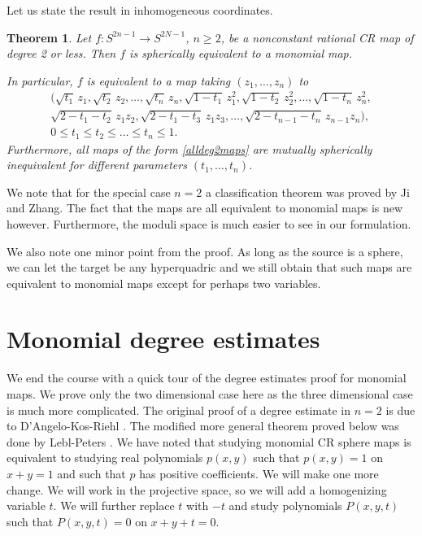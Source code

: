 \documentclass[12pt,openany]{book}
\newcommand{\sectionnewpage}{}
\theoremstyle{plain}
\newtheorem{thm}{Theorem}[section]
\theoremstyle{remark}
\theoremstyle{definition}
\theoremstyle{exercise}
\theoremstyle{example}
\begin{document}
Let us state the result in inhomogeneous coordinates.

\begin{thm} \label{thm:deg2class}
Let $f \colon S^{2n-1} \to S^{2N-1}$, $n \geq 2$, be a nonconstant
rational CR map
of degree 2 or less.  Then $f$ 
is spherically equivalent to a monomial map.

In particular, $f$ is equivalent to a map taking $(z_1,\ldots,z_n)$ to
\begin{multline} \label{alldeg2maps}
\bigl(
\sqrt{t_1} \, z_1 , 
\sqrt{t_2} \, z_2 , 
\ldots ,
\sqrt{t_n} \, z_n , 
\sqrt{1-t_1} \, z_1^2 , 
\sqrt{1-t_2} \, z_2^2 , 
\ldots ,
\sqrt{1-t_n} \, z_n^2 , 
\\
\sqrt{2-t_1-t_2} \, z_1z_2 , 
\sqrt{2-t_1-t_3} \, z_1z_3 , 
\ldots ,
\sqrt{2-t_{n-1}-t_n} \, z_{n-1}z_n \bigr) , 
\\
0 \leq t_1 \leq t_2 \leq \dots \leq t_n \leq 1.
\end{multline}
Furthermore, all maps of the form \eqref{alldeg2maps} are mutually
spherically inequivalent for different parameters $(t_1,\ldots,t_n)$.
\end{thm}

We note that for the special case
$n=2$ a classification theorem was proved by Ji and Zhang.
The fact that the maps are all equivalent to monomial maps is new however.
Furthermore, the moduli space is much easier to see in our formulation.

We also note one minor point from the proof.  As long as the source is a
sphere, we can let the target be any hyperquadric and we still obtain that
such maps are equivalent to monomial maps except for perhaps two variables.


\sectionnewpage
\section{Monomial degree estimates}

We end the course with a quick tour of the degree estimates proof for monomial maps.
We prove only the two dimensional case here as the three dimensional case
is much more complicated.
The original proof of a degree estimate in $n=2$
is due to D'Angelo-Kos-Riehl \cite{DKR}.
The
modified more general theorem proved below was done by Lebl-Peters \cite{LP}.
We have noted that studying monomial CR sphere maps
is equivalent to studying real polynomials $p(x,y)$
such that $p(x,y)=1$ on $x+y=1$ and such that $p$ has positive coefficients.
We will make one more change.  We will work in the projective space, so
we will add a homogenizing variable $t$.  We will further replace $t$ with
$-t$ and study polynomials $P(x,y,t)$ such that
$P(x,y,t) = 0$ on $x+y+t = 0$.
\end{document}
